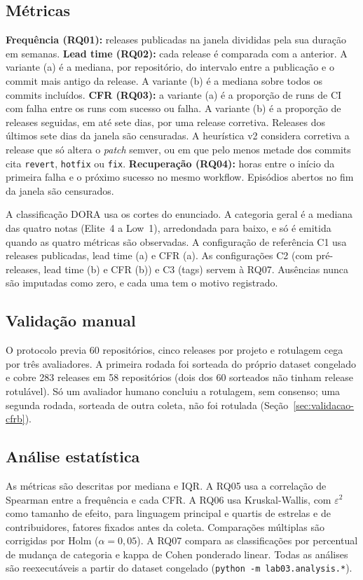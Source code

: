 \subsection{Métricas}

\textbf{Frequência (RQ01):} releases publicadas na janela divididas pela sua
duração em semanas. \textbf{Lead time (RQ02):} cada release é comparada com a
anterior. A variante (a) é a mediana, por repositório, do intervalo entre a
publicação e o commit mais antigo da release. A variante (b) é a mediana sobre
todos os commits incluídos. \textbf{CFR (RQ03):} a variante (a) é a proporção de
runs de CI com falha entre os runs com sucesso ou falha. A variante (b) é a
proporção de releases seguidas, em até sete dias, por uma release corretiva.
Releases dos últimos sete dias da janela são censuradas. A heurística v2
considera corretiva a release que só altera o \textit{patch} semver, ou em que
pelo menos metade dos commits cita \texttt{revert}, \texttt{hotfix} ou
\texttt{fix}. \textbf{Recuperação (RQ04):} horas entre o início da primeira
falha e o próximo sucesso no mesmo workflow. Episódios abertos no fim da
janela são censurados.

A classificação DORA usa os cortes do enunciado. A categoria geral é a mediana
das quatro notas (Elite~4 a Low~1), arredondada para baixo, e só é emitida
quando as quatro métricas são observadas. A configuração de referência C1 usa
releases publicadas, lead time (a) e CFR (a). As configurações C2 (com
pré-releases, lead time (b) e CFR (b)) e C3 (tags) servem à RQ07. Ausências
nunca são imputadas como zero, e cada uma tem o motivo registrado.

\subsection{Validação manual}

O protocolo previa 60 repositórios, cinco releases por projeto e rotulagem
cega por três avaliadores. A primeira rodada foi sorteada do próprio dataset
congelado e cobre 283 releases em 58 repositórios (dois dos 60 sorteados não
tinham release rotulável). Só um avaliador humano concluiu a rotulagem, sem
consenso; uma segunda rodada, sorteada de outra coleta, não foi rotulada
(Seção~\ref{sec:validacao-cfrb}).

\subsection{Análise estatística}

As métricas são descritas por mediana e IQR. A RQ05 usa a correlação de
Spearman entre a frequência e cada CFR. A RQ06 usa Kruskal-Wallis, com
$\varepsilon^2$ como tamanho de efeito, para linguagem principal e quartis de
estrelas e de contribuidores, fatores fixados antes da coleta. Comparações
múltiplas são corrigidas por Holm ($\alpha = 0{,}05$). A RQ07 compara as
classificações por percentual de mudança de categoria e kappa de Cohen
ponderado linear. Todas as análises são reexecutáveis a partir do dataset
congelado (\texttt{python -m lab03.analysis.*}).
